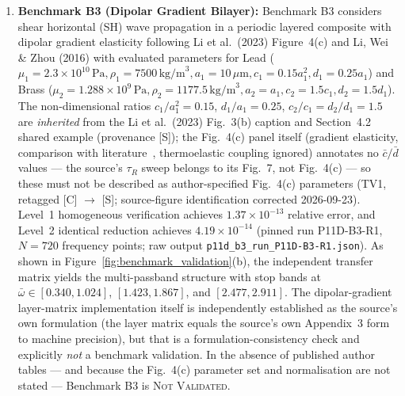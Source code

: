 \begin{enumerate}
  \item \textbf{Benchmark B3 (Dipolar Gradient Bilayer):} Benchmark B3 considers shear horizontal (SH) wave propagation in a periodic layered composite with dipolar gradient elasticity following Li et al.\ (2023) \cite{li2023anchorA} Figure~4(c) and Li, Wei \& Zhou (2016) \cite{liweizhou2016} with evaluated parameters for Lead ($\mu_1 = 2.3 \times 10^{10}\,\mathrm{Pa}, \rho_1 = 7500\,\mathrm{kg/m}^3, a_1 = 10\,\mu\mathrm{m}, c_1 = 0.15 a_1^2, d_1 = 0.25 a_1$) and Brass ($\mu_2 = 1.288 \times 10^{9}\,\mathrm{Pa}, \rho_2 = 1177.5\,\mathrm{kg/m}^3, a_2 = a_1, c_2 = 1.5 c_1, d_2 = 1.5 d_1$). The non-dimensional ratios $c_1/a_1^2 = 0.15$, $d_1/a_1 = 0.25$, $c_2/c_1 = d_2/d_1 = 1.5$ are \emph{inherited} from the Li et al.\ (2023) Fig.~3(b) caption and Section~4.2 shared example (provenance [S]); the Fig.~4(c) panel itself (gradient elasticity, comparison with literature~\cite{liweizhou2016}, thermoelastic coupling ignored) annotates no $\bar{c}/\bar{d}$ values --- the source's $\tau_R$ sweep belongs to its Fig.~7, not Fig.~4(c) --- so these must not be described as author-specified Fig.~4(c) parameters (TV1, retagged [C] $\to$ [S]; source-figure identification corrected 2026-09-23). Level~1 homogeneous verification achieves $1.37 \times 10^{-13}$ relative error, and Level~2 identical reduction achieves $4.19 \times 10^{-14}$ (pinned run P11D-B3-R1, $N = 720$ frequency points; raw output \texttt{p11d\_b3\_run\_P11D-B3-R1.json}). As shown in Figure~\ref{fig:benchmark_validation}(b), the independent transfer matrix yields the multi-passband structure with stop bands at $\bar{\omega} \in [0.340, 1.024]$, $[1.423, 1.867]$, and $[2.477, 2.911]$. The dipolar-gradient layer-matrix implementation itself is independently established as the source's own formulation (the layer matrix equals the source's own Appendix~3 form to machine precision), but that is a formulation-consistency check and explicitly \emph{not} a benchmark validation. In the absence of published author tables --- and because the Fig.~4(c) parameter set and normalisation are not stated --- Benchmark B3 is \textsc{Not Validated}.
\end{enumerate}

